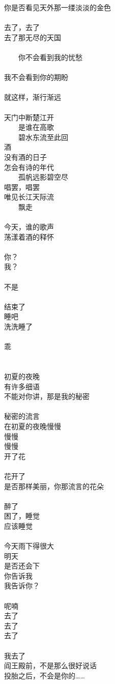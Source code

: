 你是否看见天外那一缕淡淡的金色\\
\\
去了，去了\\
去了那无尽的天国\\
\\
　　你不会看到我的忧愁\\
\\
我不会看到你的期盼\\
\\
就这样，渐行渐远\\
\\
天门中断楚江开\\
　　是谁在高歌\\
　　碧水东流至此回\\
酒\\
没有酒的日子\\
怎会有诗的年代\\
　　孤帆远影碧空尽\\
唱罢，唱罢\\
唯见长江天际流\\
　　飘走\\
\\
今天，谁的歌声\\
荡漾着酒的释怀\\
\\
你？\\
我？\\
\\
不是\\
\\
结束了\\
睡吧\\
洗洗睡了\\
\\
乖\\
\\
\\
初夏的夜晚\\
有许多细语\\
不能对你讲，那是我的秘密\\
\\
秘密的流言\\
在初夏的夜晚慢慢\\
慢慢\\
慢慢\\
开了花\\
\\
花开了\\
是否那样美丽，你那流言的花朵\\
\\
醉了\\
困了，睡觉\\
应该睡觉\\
\\
今天雨下得很大\\
明天\\
是否还会下\\
你告诉我\\
我告诉你？\\
\\
呢喃\\
去了\\
去了\\
去了\\
\\
我去了\\
阎王殿前，不是那么很好说话\\
投胎之后，不会是你的……
